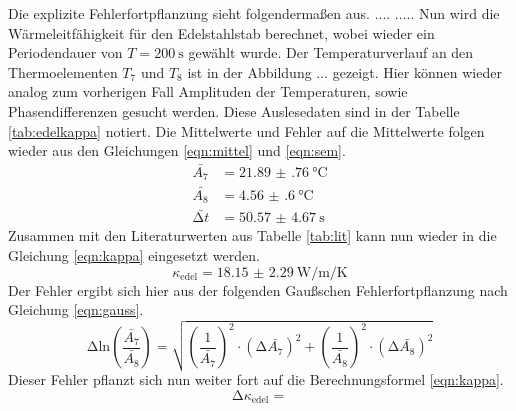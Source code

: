 Die explizite Fehlerfortpflanzung sieht folgendermaßen aus.
....
.....
Nun wird die Wärmeleitfähigkeit für den Edelstahlstab berechnet, wobei wieder ein Periodendauer von $T = \SI{200}{\second}$ gewählt wurde. Der Temperaturverlauf an den Thermoelementen 
$T_{7}$ und $T_{8}$ ist in der Abbildung ... gezeigt. Hier können wieder analog zum vorherigen Fall Amplituden der Temperaturen, sowie Phasendifferenzen gesucht werden. Diese Auslesedaten sind in der Tabelle
\ref{tab:edelkappa} notiert.
Die Mittelwerte und Fehler auf die Mittelwerte folgen wieder aus den Gleichungen \ref{eqn:mittel} und \ref{eqn:sem}.
\begin{align}
    \bar{A_{7}} &= \SI{21.89(76)}{\celsius}      \\
    \bar{A_{8}} &=  \SI{4.56(60)}{\celsius}        \\
    \bar{\increment t} &= \SI{50.57(467)}{\second}
\end{align}
Zusammen mit den Literaturwerten aus Tabelle \ref{tab:lit} kann nun wieder in die Gleichung \eqref{eqn:kappa} eingesetzt werden.
\begin{equation}
    \kappa_{\text{edel}} = \SI{18.15(229)}{\watt\per\meter\per\kelvin}
\end{equation}
Der Fehler ergibt sich hier aus der folgenden Gaußschen Fehlerfortpflanzung nach Gleichung \ref{eqn:gauss}.
\begin{equation}
 \increment \text{ln} \left( \frac{\bar{A_{7}}}{\bar{A_{8}}}\right) = \sqrt{\left( \frac{1}{\bar{A_{7}}} \right)^{2}  \cdot (\increment \bar{A_{7}})^2 + \left( \frac{1}{\bar{A_{8}}}\right)^2 \cdot (\increment \bar{A_{8}})^2}
\end{equation}
Dieser Fehler pflanzt sich nun weiter fort auf die Berechnungsformel \eqref{eqn:kappa}.
\begin{equation}
    \increment \kappa_{\text{edel}} = 
\end{equation}